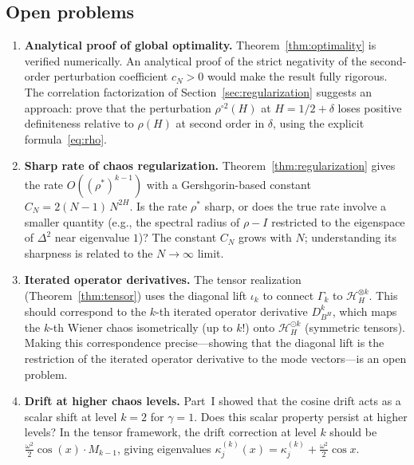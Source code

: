 \documentclass[11pt,a4paper]{article}
\theoremstyle{plain}
\theoremstyle{definition}
\theoremstyle{remark}
\newcommand{\HH}{\mathcal{H}_H}
\begin{document}
\subsection{Open problems}

\begin{enumerate}[label=(\roman*)]
\item \textbf{Analytical proof of global optimality.}
  Theorem~\ref{thm:optimality} is verified numerically.
  An analytical proof of the strict negativity of the
  second-order perturbation coefficient $c_N > 0$
  would make the result fully rigorous.
  The correlation factorization of
  Section~\ref{sec:regularization} suggests an approach:
  prove that the perturbation $\rho^{\circ 2}(H)$ at
  $H = 1/2 + \delta$ loses positive definiteness
  relative to $\rho(H)$ at second order in $\delta$,
  using the explicit formula~\eqref{eq:rho}.

\item \textbf{Sharp rate of chaos regularization.}
  Theorem~\ref{thm:regularization} gives the rate
  $O((\rho^*)^{k-1})$ with a Gershgorin-based constant
  $C_N = 2(N{-}1)\,N^{2H}$.  Is the rate $\rho^*$ sharp,
  or does the true rate involve a smaller quantity
  (e.g., the spectral radius of $\rho - I$ restricted
  to the eigenspace of $\Delta^2$ near eigenvalue $1$)?
  The constant $C_N$ grows with $N$; understanding its
  sharpness is related to the $N \to \infty$ limit.

\item \textbf{Iterated operator derivatives.}
  The tensor realization (Theorem~\ref{thm:tensor}) uses
  the diagonal lift $\iota_k$ to connect $\Gamma_k$ to
  $\HH^{\otimes k}$.  This should correspond to the
  $k$-th iterated operator derivative
  $D_{B^H}^k$, which maps the $k$-th Wiener chaos
  isometrically (up to $k!$) onto $\HH^{\odot k}$
  (symmetric tensors).  Making this correspondence
  precise---showing that the diagonal lift is the
  restriction of the iterated operator derivative
  to the mode vectors---is an open problem.

\item \textbf{Drift at higher chaos levels.}
  Part~I showed that the cosine drift acts as a scalar
  shift at level $k = 2$ for $\gamma = 1$.
  Does this scalar property persist at higher levels?
  In the tensor framework, the drift correction
  at level $k$ should be
  $\frac{\omega^2}{2}\cos(x) \cdot M_{k-1}$,
  giving eigenvalues
  $\kappa_j^{(k)}(x) = \kappa_j^{(k)}
  + \frac{\omega^2}{2}\cos x$.


\end{enumerate}
\end{document}
